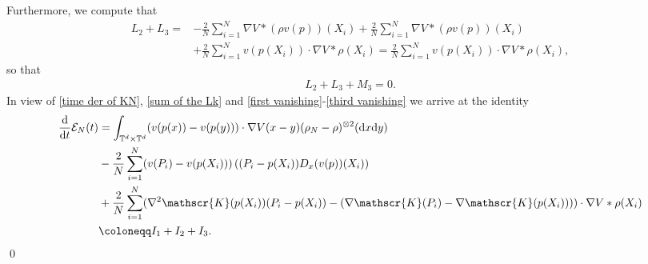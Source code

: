 \documentclass[11pt,reqno]{amsart}
\numberwithin{equation}{section}
\def\dd{{\rm d}}
\begin{document}
Furthermore, we compute that  
\begin{align*}
L_{2}+L_{3}=&-\frac{2}{N}\sum_{i=1}^{N} \nabla V\ast (\rho v(p))(X_{i})+\frac{2}{N}\sum_{i=1}^{N}\nabla V\ast (\rho v(p))(X_{i})\\
&+\frac{2}{N}\sum_{i=1}^{N}v(p(X_{i}))\cdot\nabla V\ast \rho(X_{i})=\frac{2}{N}\sum_{i=1}^{N}v(p(X_{i}))\cdot \nabla V \ast \rho(X_{i}),     
\end{align*}
so that 
\begin{align}
L_{2}+L_{3}+M_{3}=0. \label{third vanishing} \end{align}
In view of \eqref{time der of KN}, \eqref{sum of the Lk} and \eqref{first vanishing}-\eqref{third vanishing} we arrive at the identity 
\begin{align}
\frac{\dd}{\dd t}\mathcal{E}_{N}(t)&=\int_{\mathbb{T}^{d}\times \mathbb{T}^{d}}(v(p(x))-v(p(y)))\cdot \nabla V(x-y)(\rho_{N}-\rho)^{\otimes 2}(\dd x\dd y) \notag\\
&-\frac{2}{N}\sum_{i=1}^{N}(v(P_{i})-v(p(X_{i})))\left((P_{i}-p(X_{i}))D_{x}(v(p))(X_{i})\right) \notag\\
&+\frac{2}{N}\sum_{i=1}^{N}(\nabla^{2}\mathscr{K}(p(X_{i}))(P_{i}-p(X_{i}))-(\nabla \mathscr{K}(P_{i})-\nabla \mathscr{K}(p(X_{i}))))\cdot \nabla V\ast \rho(X_{i}) \notag\\
&\coloneqq I_{1}+I_{2}+I_{3}. \label{I1I3 DEF} 
\end{align}
\qed

\vspace{0.4 cm}
\end{document}
